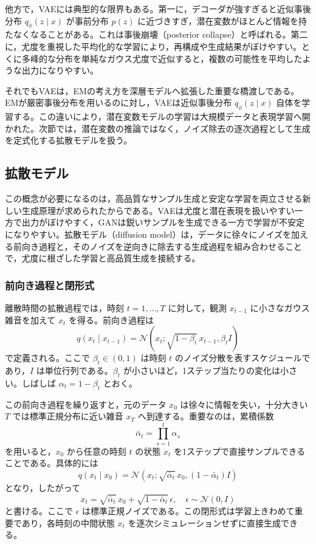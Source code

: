 他方で，VAEには典型的な限界もある。第一に，デコーダが強すぎると近似事後分布 \(q_{\phi}(z \mid x)\) が事前分布 \(p(z)\) に近づきすぎ，潜在変数がほとんど情報を持たなくなることがある。これは事後崩壊（posterior collapse）と呼ばれる。第二に，尤度を重視した平均化的な学習により，再構成や生成結果がぼけやすい。とくに多峰的な分布を単純なガウス尤度で近似すると，複数の可能性を平均したような出力になりやすい。

それでもVAEは，EMの考え方を深層モデルへ拡張した重要な橋渡しである。EMが厳密事後分布を用いるのに対し，VAEは近似事後分布 \(q_{\phi}(z \mid x)\) 自体を学習する。この違いにより，潜在変数モデルの学習は大規模データと表現学習へ開かれた。次節では，潜在変数の推論ではなく，ノイズ除去の逐次過程として生成を定式化する拡散モデルを扱う。

\subsection{拡散モデル}

この概念が必要になるのは，高品質なサンプル生成と安定な学習を両立させる新しい生成原理が求められたからである。VAEは尤度と潜在表現を扱いやすい一方で出力がぼけやすく，GAN\cite{Goodfellow2014}は鋭いサンプルを生成できる一方で学習が不安定になりやすい。拡散モデル（diffusion model）\cite{Ho2020}は，データに徐々にノイズを加える前向き過程と，そのノイズを逆向きに除去する生成過程を組み合わせることで，尤度に根ざした学習と高品質生成を接続する。

\subsubsection{前向き過程と閉形式}

離散時間の拡散過程では，時刻 \(t=1,\dots,T\) に対して，観測 \(x_{t-1}\) に小さなガウス雑音を加えて \(x_t\) を得る。前向き過程は
\begin{equation}
q(x_t \mid x_{t-1})
=
\mathcal{N}(x_t; \sqrt{1-\beta_t}\,x_{t-1}, \beta_t I)
\end{equation}
で定義される。ここで \(\beta_t \in (0,1)\) は時刻 \(t\) のノイズ分散を表すスケジュールであり，\(I\) は単位行列である。\(\beta_t\) が小さいほど，1ステップ当たりの変化は小さい。しばしば \(\alpha_t = 1-\beta_t\) とおく。

この前向き過程を繰り返すと，元のデータ \(x_0\) は徐々に情報を失い，十分大きい \(T\) では標準正規分布に近い雑音 \(x_T\) へ到達する。重要なのは，累積係数
\begin{equation}
\bar{\alpha}_t = \prod_{s=1}^{t}\alpha_s
\end{equation}
を用いると，\(x_0\) から任意の時刻 \(t\) の状態 \(x_t\) を1ステップで直接サンプルできることである。具体的には
\begin{equation}
q(x_t \mid x_0)
=
\mathcal{N}(x_t; \sqrt{\bar{\alpha}_t}\,x_0, (1-\bar{\alpha}_t)I)
\end{equation}
となり，したがって
\begin{equation}
x_t=\sqrt{\bar{\alpha}_t}\,x_0+\sqrt{1-\bar{\alpha}_t}\,\epsilon,
\quad
\epsilon \sim \mathcal{N}(0,I)
\end{equation}
と書ける。ここで \(\epsilon\) は標準正規ノイズである。この閉形式は学習上きわめて重要であり，各時刻の中間状態 \(x_t\) を逐次シミュレーションせずに直接生成できる。


